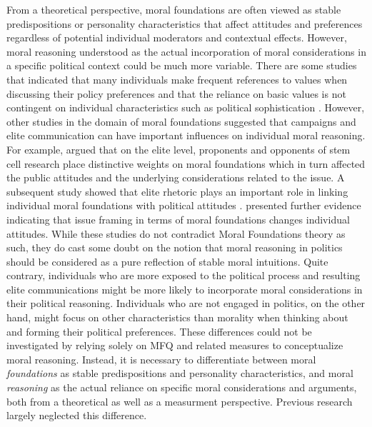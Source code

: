 \documentclass[12pt]{article}
\begin{document}
From a theoretical perspective, moral foundations are often viewed as stable predispositions or personality characteristics that affect attitudes and preferences regardless of potential individual moderators and contextual effects. However, moral reasoning understood as the actual incorporation of moral considerations in a specific political context could be much more variable. There are some studies that indicated that many individuals make frequent references to values when discussing their policy preferences \citep{feldman1992political} and that the reliance on basic values is not contingent on individual characteristics such as political sophistication \citep[e.g.][]{goren2001core,goren2004political,marietta2007values}. However, other studies in the domain of moral foundations suggested that campaigns and elite communication can have important influences on individual moral reasoning. For example, \citet{clifford2013words} argued that on the elite level, proponents and opponents of stem cell research place distinctive weights on moral foundations which in turn affected the public attitudes and the underlying considerations related to the issue. A subsequent study showed that elite rhetoric plays an important role in linking individual moral foundations with political attitudes \citep{clifford2015concerns}. \citet{day2014shifting} presented further evidence indicating that issue framing in terms of moral foundations changes individual attitudes. While these studies do not contradict Moral Foundations theory as such, they do cast some doubt on the notion that moral reasoning in politics should be considered as a pure reflection of stable moral intuitions. Quite contrary, individuals who are more exposed to the political process and resulting elite communications might be more likely to incorporate moral considerations in their political reasoning. Individuals who are not engaged in politics, on the other hand, might focus on other characteristics than morality when thinking about and forming their political preferences. These differences could not be investigated by relying solely on MFQ and related measures to conceptualize moral reasoning. Instead, it is necessary to differentiate between moral \textit{foundations} as stable predispositions and personality characteristics, and moral \textit{reasoning} as the actual reliance on specific moral considerations and arguments, both from a theoretical as well as a measurment perspective. Previous research largely neglected this difference.
\end{document}
